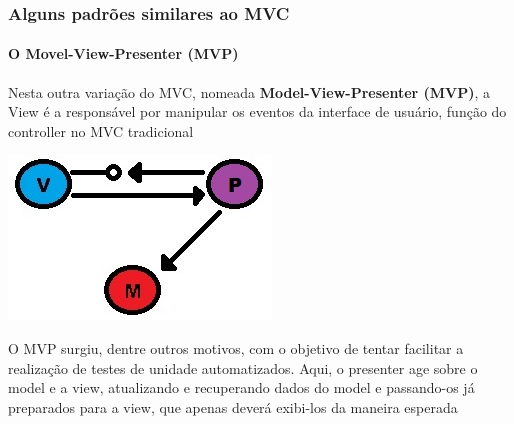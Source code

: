 \documentclass{beamer}
\begin{document}
\begin{frame}
\frametitle{Alguns padrões similares ao MVC}
\framesubtitle{O Movel-View-Presenter (MVP)}
	Nesta outra variação do MVC, nomeada \textbf{Model-View-Presenter (MVP)}, a View é a responsável por manipular os eventos da interface de usuário, função do controller no MVC tradicional
	\begin{center}
		\includegraphics[scale=0.4]{MVP.jpg}
	\end{center}
	O MVP surgiu, dentre outros motivos, com o objetivo de tentar facilitar a realização de testes de unidade automatizados. Aqui, o presenter age sobre o model
	e a view, atualizando e recuperando dados do model e passando-os já preparados para a view, que apenas deverá exibi-los da maneira esperada
\end{frame}
\end{document}
